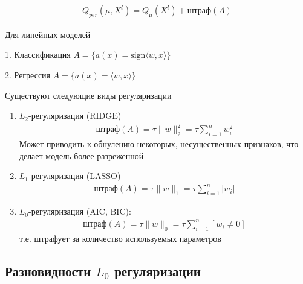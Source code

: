 \begin{align*}
    Q_{per} (\mu, X^l) = Q_{\mu}(X^l) + \text{штраф}(A)
\end{align*}


\par Для линейных моделей

1. Классификация $A = \{a(x) = \text{sign}\langle w, x \rangle\}$

2. Регрессия $A = \{a(x) = \langle w, x \rangle \}$

\par Существуют следующие виды регуляризации

\begin{enumerate}
    \item $L_2$-регуляризация (RIDGE)
        \begin{align*}
            \text{штраф}(A) =  \tau \|w\|_2^2 = \tau \sum\limits_{i = 1}^n w_i^2
        \end{align*}
        Может приводить к обнулению некоторых, несущественных признаков, что делает модель более разреженной
    \item $L_1$-регуляризация (LASSO)
        \begin{align*}
            \text{штраф}(A) = \tau \|w\|_1 = \tau \sum\limits_{i = 1}^n |w_i|
        \end{align*}
    \item $L_0$-регуляризация (AIC, BIC):
        \begin{align*}
            \text{штраф}(A) = \tau\|w\|_0 = \tau\sum\limits_{i = 1}^n [w_i \neq 0]
        \end{align*}
        т.е. штрафует за количество используемых параметров
\end{enumerate}

\subsection*{Разновидности $L_0$ регуляризации}


